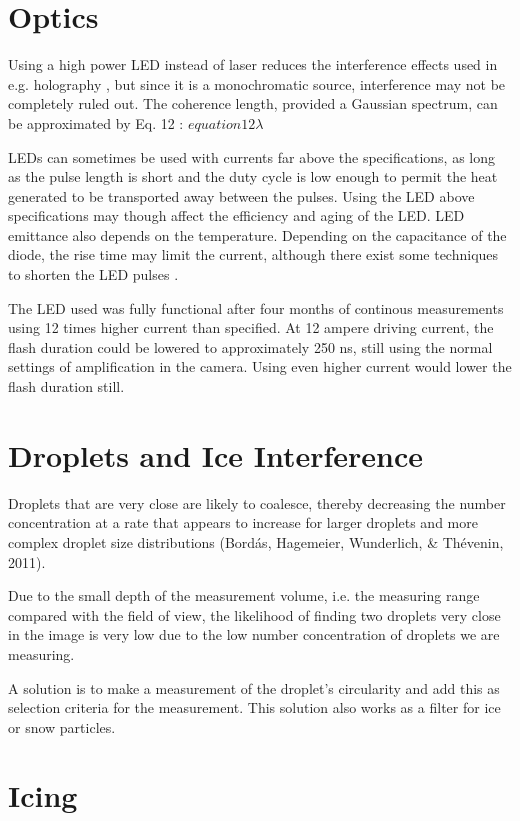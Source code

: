 \section{Optics}
Using a high power LED instead of laser reduces the interference effects used in e.g. holography \cite{henn2013}, but since it is a monochromatic source, interference may not be completely ruled out. The coherence length, provided a Gaussian spectrum, can be approximated by Eq. 12 \cite{akcay2002}: $equation12λ$

LEDs can sometimes be used with currents far above the specifications, as long as the pulse length is short and the duty cycle is low enough to permit the heat generated to be transported away between the pulses. Using the LED above specifications may though affect the efficiency and aging of the LED. LED emittance also depends on the temperature. Depending on the capacitance of the diode, the rise time may limit the current, although there exist some techniques to shorten the LED pulses \cite{tanaka2011,vele2007}.

The LED used was fully functional after four months of continous measurements using 12 times higher current than specified. At 12 ampere driving current, the flash duration could be lowered to approximately 250 ns, still using the normal settings of amplification in the camera. Using even higher current would lower the flash duration still.


\section{Droplets and Ice Interference}

Droplets that are very close are likely to coalesce, thereby decreasing the number concentration at a rate that appears to increase for larger droplets and more complex droplet size distributions (Bordás, Hagemeier, Wunderlich, \& Thévenin, 2011). 

Due to the small depth of the measurement volume, i.e. the measuring range compared with the field of view, the likelihood of finding two droplets very close in the image is very low due to the low number concentration of droplets we are measuring.

A solution is to make a measurement of the droplet’s circularity and add this as selection criteria for the measurement. This solution also works as a filter for ice or snow particles. 

\section{Icing}

